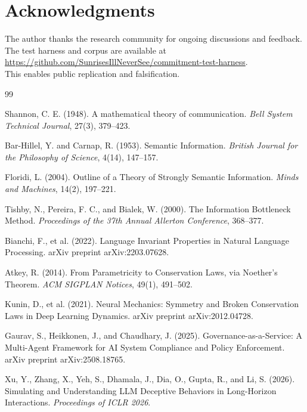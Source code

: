\documentclass[11pt,a4paper]{article}
\begin{document}
\section*{Acknowledgments}

The author thanks the research community for ongoing discussions and feedback. The test harness and corpus are available at\\
{\sloppy\url{https://github.com/SunrisesIllNeverSee/commitment-test-harness}}.\\
This enables public replication and falsification.


\begin{thebibliography}{99}
\sloppy
\raggedright

Shannon, C. E. (1948).
A mathematical theory of communication.
\textit{Bell System Technical Journal}, 27(3), 379--423.

Bar-Hillel, Y. and Carnap, R. (1953).
Semantic Information.
\textit{British Journal for the Philosophy of Science}, 4(14), 147--157.

Floridi, L. (2004).
Outline of a Theory of Strongly Semantic Information.
\textit{Minds and Machines}, 14(2), 197--221.

Tishby, N., Pereira, F. C., and Bialek, W. (2000).
The Information Bottleneck Method.
\textit{Proceedings of the 37th Annual Allerton Conference}, 368--377.

Bianchi, F., et al. (2022).
Language Invariant Properties in Natural Language Processing.
arXiv preprint arXiv:2203.07628.

Atkey, R. (2014).
From Parametricity to Conservation Laws, via Noether's Theorem.
\textit{ACM SIGPLAN Notices}, 49(1), 491--502.

Kunin, D., et al. (2021).
Neural Mechanics: Symmetry and Broken Conservation Laws in Deep Learning Dynamics.
arXiv preprint arXiv:2012.04728.

Gaurav, S., Heikkonen, J., and Chaudhary, J. (2025).
Governance-as-a-Service: A Multi-Agent Framework for AI System Compliance and Policy Enforcement.
arXiv preprint arXiv:2508.18765.

Xu, Y., Zhang, X., Yeh, S., Dhamala, J., Dia, O., Gupta, R., and Li, S. (2026).
Simulating and Understanding LLM Deceptive Behaviors in Long-Horizon Interactions.
\textit{Proceedings of ICLR 2026}.


\end{thebibliography}
\end{document}
